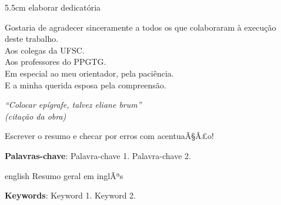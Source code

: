 \documentclass[
	12pt,				%
	oneside,			%
	a4paper,			%
	chapter=TITLE,		%
	section=TITLE,		%
	brazil,			%
	english				%
	]{abntex2}
\begin{document}
\begin{dedicatoria}
	\vspace*{\fill}
	\noindent
	\begin{adjustwidth*}{}{5.5cm} 
		\raggedleft       
		elaborar dedicatória
	\end{adjustwidth*}
\end{dedicatoria}

\begin{agradecimentos}
	Gostaria de agradecer sinceramente a todos os que colaboraram à execução\\
 deste trabalho.\\
 Aos colegas da UFSC.\\
 Aos professores do PPGTG.\\
 Em especial ao meu orientador, pela paciência.\\
 E a minha querida esposa pela compreensão.
\end{agradecimentos}

\begin{epigrafe}
	\vspace*{\fill}
	\begin{flushright}
		\textit{``Colocar epígrafe, talvez eliane brum''\\
(citação da obra)}
	\end{flushright}
\end{epigrafe}


\setlength{\absparsep}{18pt} %
\begin{resumo}
	\SingleSpacing
  Escrever o resumo e checar por erros com acentuaÃ§Ã£o! 
  
  \textbf{Palavras-chave}: 
    Palavra-chave 1.
    Palavra-chave 2.
  \end{resumo}
\begin{resumo}[Abstract]
	\SingleSpacing
	\begin{otherlanguage*}{english}
		Resumo geral em inglÃªs
		
		\textbf{Keywords}:
	      Keyword 1.
        Keyword 2.
    	\end{otherlanguage*}
\end{resumo}
% 
%
%  
\end{document}
